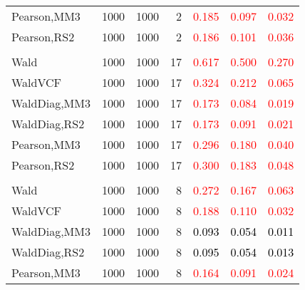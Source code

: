 \documentclass[
]{article}
\begin{document}
\begin{table}[H]
{\begin{tabular}[t]{lrrrrrr}
\hspace{1em}Pearson,MM3 & 1000 & 1000 & 2 & \textcolor{red}{0.185} & \textcolor{red}{0.097} & \textcolor{red}{0.032}\\
\hspace{1em}Pearson,RS2 & 1000 & 1000 & 2 & \textcolor{red}{0.186} & \textcolor{red}{0.101} & \textcolor{red}{0.036}\\
\addlinespace[0.3em]
\multicolumn{7}{l}{\textbf{1F 15V}}\\
\hspace{1em}Wald & 1000 & 1000 & 17 & \textcolor{red}{0.617} & \textcolor{red}{0.500} & \textcolor{red}{0.270}\\
\hspace{1em}WaldVCF & 1000 & 1000 & 17 & \textcolor{red}{0.324} & \textcolor{red}{0.212} & \textcolor{red}{0.065}\\
\hspace{1em}WaldDiag,MM3 & 1000 & 1000 & 17 & \textcolor{red}{0.173} & \textcolor{red}{0.084} & \textcolor{red}{0.019}\\
\hspace{1em}WaldDiag,RS2 & 1000 & 1000 & 17 & \textcolor{red}{0.173} & \textcolor{red}{0.091} & \textcolor{red}{0.021}\\
\hspace{1em}Pearson,MM3 & 1000 & 1000 & 17 & \textcolor{red}{0.296} & \textcolor{red}{0.180} & \textcolor{red}{0.040}\\
\hspace{1em}Pearson,RS2 & 1000 & 1000 & 17 & \textcolor{red}{0.300} & \textcolor{red}{0.183} & \textcolor{red}{0.048}\\
\addlinespace[0.3em]
\multicolumn{7}{l}{\textbf{2F 10V}}\\
\hspace{1em}Wald & 1000 & 1000 & 8 & \textcolor{red}{0.272} & \textcolor{red}{0.167} & \textcolor{red}{0.063}\\
\hspace{1em}WaldVCF & 1000 & 1000 & 8 & \textcolor{red}{0.188} & \textcolor{red}{0.110} & \textcolor{red}{0.032}\\
\hspace{1em}WaldDiag,MM3 & 1000 & 1000 & 8 & \textcolor{black}{0.093} & \textcolor{black}{0.054} & \textcolor{black}{0.011}\\
\hspace{1em}WaldDiag,RS2 & 1000 & 1000 & 8 & \textcolor{black}{0.095} & \textcolor{black}{0.054} & \textcolor{black}{0.013}\\
\hspace{1em}Pearson,MM3 & 1000 & 1000 & 8 & \textcolor{red}{0.164} & \textcolor{red}{0.091} & \textcolor{red}{0.024}\\

\end{tabular}}
\end{table}
\end{document}
